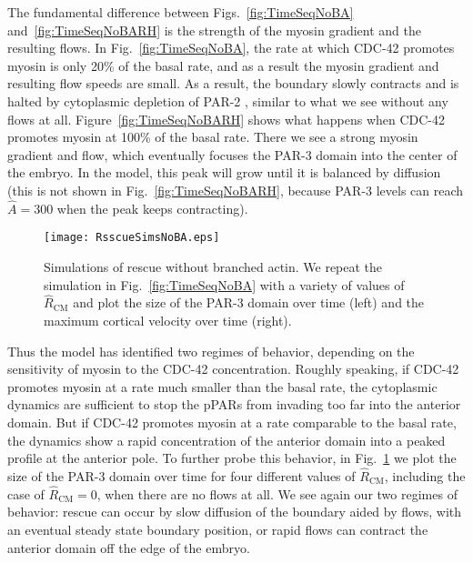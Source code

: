 \documentclass[11pt]{article}
\newcommand{\6}[1]{#1_{\text{6}}}
\newcommand{\3}[1]{#1_{\text{3}}}
\begin{document}
The fundamental difference between Figs.\ \ref{fig:TimeSeqNoBA} and\ \ref{fig:TimeSeqNoBARH} is the strength of the myosin gradient and the resulting flows. In Fig.\ \ref{fig:TimeSeqNoBA}, the rate at which CDC-42 promotes myosin is only 20\% of the basal rate, and as a result the myosin gradient and resulting flow speeds are small. As a result, the boundary slowly contracts and is halted by cytoplasmic depletion of PAR-2 \cite{goehring2011polarization}, similar to what we see without any flows at all. Figure\ \ref{fig:TimeSeqNoBARH} shows what happens when CDC-42 promotes myosin at 100\% of the basal rate. There we see a strong myosin gradient and flow, which eventually focuses the PAR-3 domain into the center of the embryo. In the model, this peak will grow until it is balanced by diffusion (this is not shown in Fig.\ \ref{fig:TimeSeqNoBARH}, because PAR-3 levels can reach $\hat A=300$ when the peak keeps contracting). 

\begin{figure}
\centering
\texttt{[image: RsscueSimsNoBA.eps]}
\caption{\label{fig:RescueNoBA}Simulations of rescue without branched actin. We repeat the simulation in Fig.\ \ref{fig:TimeSeqNoBA} with a variety of values of $\hat R_\text{CM}$ and plot the size of the PAR-3 domain over time (left) and the maximum cortical velocity over time (right). }
\end{figure}


Thus the model has identified two regimes of behavior, depending on the sensitivity of myosin to the CDC-42 concentration. Roughly speaking, if CDC-42 promotes myosin at a rate much smaller than the basal rate, the cytoplasmic dynamics are sufficient to stop the pPARs from invading too far into the anterior domain. But if CDC-42 promotes myosin at a rate comparable to the basal rate, the dynamics show a rapid concentration of the anterior domain into a peaked profile at the anterior pole. 
To further probe this behavior, in Fig.\ \ref{fig:RescueNoBA} we plot the size of the PAR-3 domain over time for four different values of $\hat R_\text{CM}$, including the case of $\hat R_\text{CM}=0$, when there are no flows at all. We see again our two regimes of behavior: rescue can occur by slow diffusion of the boundary aided by flows, with an eventual steady state boundary position, or rapid flows can contract the anterior domain off the edge of the embryo. 
\end{document}
